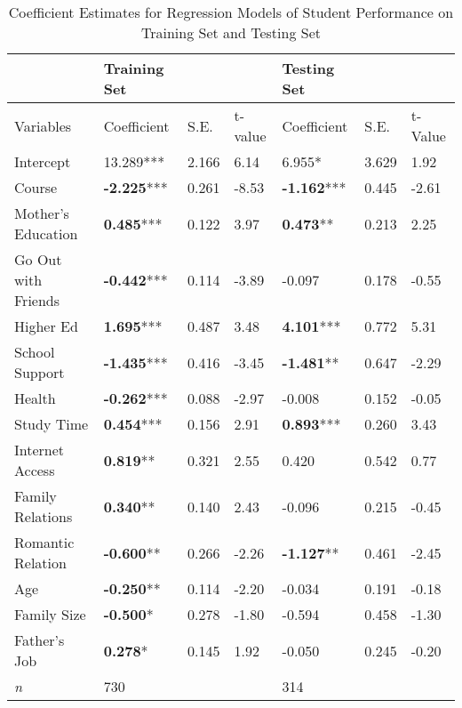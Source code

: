 \documentclass[sigconf]{acmart}
\begin{document}
\begin{table*}[ht]
  \caption{Coefficient Estimates for Regression Models of Student Performance on 
  Training Set and Testing Set}
  \label{tab:freq}
  \begin{tabular}{lllllll}
    \toprule
                        & Training Set      &        &         & Testing Set &         &          \\
    \midrule
    Variables           & Coefficient        & S.E.  & t-value & Coefficient & S.E. & t-Value  \\
    \midrule
    Intercept           &       13.289***    & 2.166 &  6.14  &          6.955*     & 3.629 &  1.92 \\
    Course              & \textbf{-2.225}*** & 0.261 & -8.53  & \textbf{-1.162}***  & 0.445 & -2.61 \\
    Mother's Education  & \textbf{ 0.485}*** & 0.122 &  3.97  & \textbf{ 0.473}**   & 0.213 &  2.25 \\
    Go Out with Friends & \textbf{-0.442}*** & 0.114 & -3.89  &         -0.097      & 0.178 & -0.55 \\
    Higher Ed           & \textbf{ 1.695}*** & 0.487 &  3.48  & \textbf{ 4.101}***  & 0.772 &  5.31 \\    
    School Support      & \textbf{-1.435}*** & 0.416 & -3.45  & \textbf{-1.481}**   & 0.647 & -2.29 \\
    Health              & \textbf{-0.262}*** & 0.088 & -2.97  &         -0.008      & 0.152 & -0.05 \\
    Study Time          & \textbf{ 0.454}*** & 0.156 &  2.91  & \textbf{ 0.893}***  & 0.260 &  3.43 \\
    Internet Access     & \textbf{ 0.819}**  & 0.321 &  2.55  &          0.420      & 0.542 &  0.77 \\
    Family Relations    & \textbf{ 0.340}**  & 0.140 &  2.43  &         -0.096      & 0.215 & -0.45 \\
    Romantic Relation   & \textbf{-0.600}**  & 0.266 & -2.26  & \textbf{-1.127}**   & 0.461 & -2.45 \\
    Age                 & \textbf{-0.250}**  & 0.114 & -2.20  &         -0.034      & 0.191 & -0.18 \\
    Family Size         & \textbf{-0.500}*   & 0.278 & -1.80  &         -0.594      & 0.458 & -1.30 \\
    Father's Job        & \textbf{ 0.278}*   & 0.145 &  1.92  &         -0.050      & 0.245 & -0.20 \\
    \midrule
    \textit{n}          &       730          &       &        &         314         &       &       \\

\end{tabular}
\end{table*}
\end{document}
